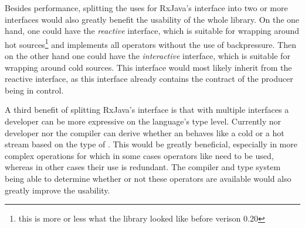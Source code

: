 Besides performance, splitting the uses for RxJava's \obs interface into two or more interfaces would also greatly benefit the usability of the whole library. On the one hand, one could have the \textit{reactive} \obs interface, which is suitable for wrapping around hot sources\footnote{this is more or less what the library looked like before verison 0.20} and implements all operators without the use of backpressure. Then on the other hand one could have the \textit{interactive} \obs interface, which is suitable for wrapping around cold sources. This interface would most likely inherit from the reactive \obs interface, as this interface already contains the contract of the producer being in control.

A third benefit of splitting RxJava's \obs interface is that with multiple interfaces a developer can be more expressive on the language's type level. Currently nor developer nor the compiler can derive whether an \obs behaves like a cold or a hot stream based on the type of \obs. This would be greatly beneficial, especially in more complex operations for which in some cases operators like  need to be used, whereas in other cases their use is redundant. The compiler and type system being able to determine whether or not these operators are available would also greatly improve the usability.